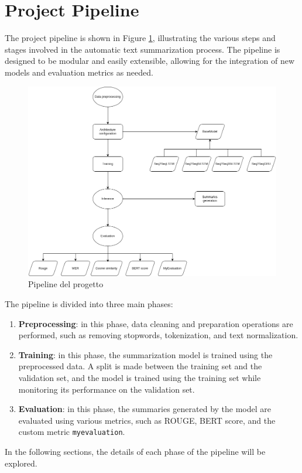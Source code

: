 \section{Project Pipeline}
The project pipeline is shown in Figure \ref{fig:pipeline}, illustrating the various steps and stages involved in the automatic text summarization process. The pipeline is designed to be modular and easily extensible, allowing for the integration of new models and evaluation metrics as needed.

\begin{figure}[H]
    \centering
    \includegraphics[width=1\textwidth]{media/pipeline.png}
    \caption{Pipeline del progetto}
    \label{fig:pipeline}
\end{figure}

The pipeline is divided into three main phases:
\begin{enumerate}
    \item \textbf{Preprocessing}: in this phase, data cleaning and preparation operations are performed, such as removing stopwords, tokenization, and text normalization.
    \item \textbf{Training}: in this phase, the summarization model is trained using the preprocessed data. A split is made between the training set and the validation set, and the model is trained using the training set while monitoring its performance on the validation set.
    \item \textbf{Evaluation}: in this phase, the summaries generated by the model are evaluated using various metrics, such as ROUGE, BERT score, and the custom metric \texttt{myevaluation}.
\end{enumerate}
In the following sections, the details of each phase of the pipeline will be explored.